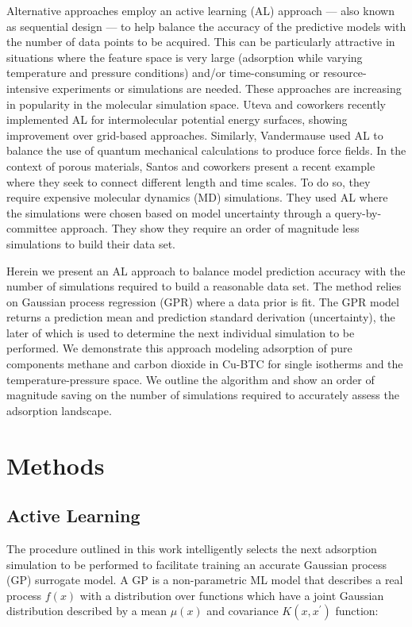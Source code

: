 \documentclass[twoside,twocolumn,9pt]{article}
\begin{document}
Alternative approaches employ an active learning (AL) approach --- also known as sequential design --- to help balance the accuracy of the predictive models with the number of data points to be acquired. This can be particularly attractive in situations where the feature space is very large (adsorption while varying temperature and pressure conditions) and/or time-consuming or resource-intensive experiments or simulations are needed. These approaches are increasing in popularity in the molecular simulation space. Uteva and coworkers recently implemented AL for intermolecular potential energy surfaces, showing improvement over grid-based approaches.\cite{active_learning} Similarly, Vandermause used AL to balance the use of quantum mechanical calculations to produce force fields.\cite{vandermause} In the context of porous materials, Santos and coworkers present a recent example where they seek to connect different length and time scales.\cite{santos_al} To do so, they require expensive molecular dynamics (MD) simulations. They used AL where the simulations were chosen based on model uncertainty through a query-by-committee approach. They show they require an order of magnitude less simulations to build their data set.
	
Herein we present an AL approach to balance model prediction accuracy with the number of simulations required to build a reasonable data set. The method relies on Gaussian process regression (GPR) where a data prior is fit.\cite{gaussianprocesses} The GPR model returns a prediction mean and prediction standard derivation (uncertainty), the later of which is used to determine the next individual simulation to be performed. We demonstrate this approach modeling adsorption of pure components methane and carbon dioxide in Cu-BTC for single isotherms and the temperature-pressure space. We outline the algorithm and show an order of magnitude saving on the number of simulations required to accurately assess the adsorption landscape.

\section{Methods}
\subsection{Active Learning}
The procedure outlined in this work intelligently selects the next adsorption simulation to be performed to facilitate training an accurate Gaussian process (GP) surrogate model. A GP is a non-parametric ML model that describes a real process $f(x)$ with a distribution over functions which have a joint Gaussian distribution described by a mean $\mu(x)$ and covariance $K(x,x^{'})$ function\cite{gaussianprocesses}:
\end{document}
